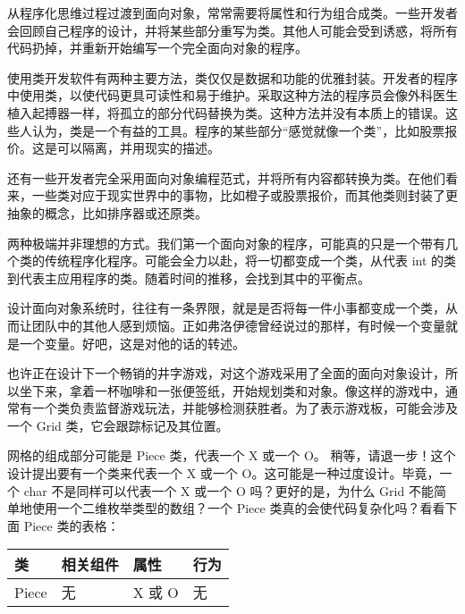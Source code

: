 
从程序化思维过程过渡到面向对象，常常需要将属性和行为组合成类。一些开发者会回顾自己程序的设计，并将某些部分重写为类。其他人可能会受到诱惑，将所有代码扔掉，并重新开始编写一个完全面向对象的程序。

使用类开发软件有两种主要方法，类仅仅是数据和功能的优雅封装。开发者的程序中使用类，以使代码更具可读性和易于维护。采取这种方法的程序员会像外科医生植入起搏器一样，将孤立的部分代码替换为类。这种方法并没有本质上的错误。这些人认为，类是一个有益的工具。程序的某些部分“感觉就像一个类”，比如股票报价。这是可以隔离，并用现实的描述。

还有一些开发者完全采用面向对象编程范式，并将所有内容都转换为类。在他们看来，一些类对应于现实世界中的事物，比如橙子或股票报价，而其他类则封装了更抽象的概念，比如排序器或还原类。

两种极端并非理想的方式。我们第一个面向对象的程序，可能真的只是一个带有几个类的传统程序化程序。可能会全力以赴，将一切都变成一个类，从代表 int 的类到代表主应用程序的类。随着时间的推移，会找到其中的平衡点。


设计面向对象系统时，往往有一条界限，就是是否将每一件小事都变成一个类，从而让团队中的其他人感到烦恼。正如弗洛伊德曾经说过的那样，有时候一个变量就是一个变量。好吧，这是对他的话的转述。

也许正在设计下一个畅销的井字游戏，对这个游戏采用了全面的面向对象设计，所以坐下来，拿着一杯咖啡和一张便签纸，开始规划类和对象。像这样的游戏中，通常有一个类负责监督游戏玩法，并能够检测获胜者。为了表示游戏板，可能会涉及一个 Grid 类，它会跟踪标记及其位置。

网格的组成部分可能是 Piece 类，代表一个 X 或一个 O。 稍等，请退一步！这个设计提出要有一个类来代表一个 X 或一个 O。这可能是一种过度设计。毕竟，一个 char 不是同样可以代表一个 X 或一个 O 吗？更好的是，为什么 Grid 不能简单地使用一个二维枚举类型的数组？一个 Piece 类真的会使代码复杂化吗？看看下面 Piece 类的表格：

\begin{longtable}{|l|l|l|l|}
\hline
\textbf{类} & \textbf{相关组件} & \textbf{属性} & \textbf{行为} \\ \hline
\endfirsthead
%
\endhead
%
Piece          & 无                           & X 或 O              & 无               \\ \hline
\end{longtable}

